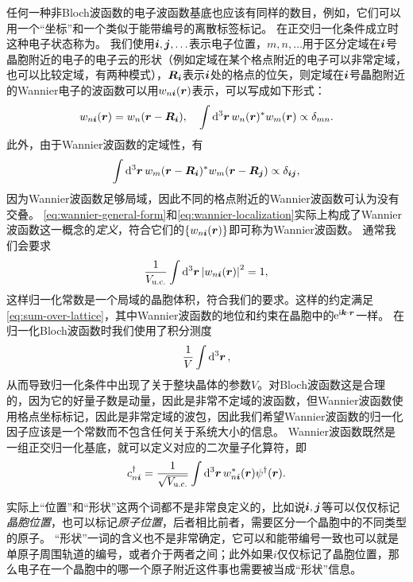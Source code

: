 任何一种非Bloch波函数的电子波函数基底也应该有同样的数目，例如，它们可以用一个“坐标”和一个类似于能带编号的离散标签标记。
在正交归一化条件成立时这种电子状态称为。
我们使用$\vb*{i}, \vb*{j}, \ldots$表示电子位置，$m, n, \ldots$用于区分定域在$\vb*{i}$号晶胞附近的电子的电子云的形状（例如定域在某个格点附近的电子可以非常定域，也可以比较定域，有两种模式），$\vb*{R}_{\vb*{i}}$表示$\vb*{i}$处的格点的位矢，则定域在$\vb*{i}$号晶胞附近的Wannier电子的波函数可以用$w_{n\vb*{i}}(\vb*{r})$表示，可以写成如下形式：
\begin{equation}
    w_{n \vb*{i}}(\vb*{r}) = w_{n}(\vb*{r} - \vb*{R}_{\vb*{i}}), \quad \int \dd[3]{\vb*{r}} w_n(\vb*{r})^* w_m(\vb*{r}) \propto \delta_{mn}.
    \label{eq:wannier-general-form}
\end{equation}
此外，由于Wannier波函数的定域性，有
\begin{equation}
    \int \dd[3]{\vb*{r}} w_m(\vb*{r} - \vb*{R}_{\vb*{i}})^* w_m(\vb*{r} - \vb*{R}_{\vb*{j}}) \propto \delta_{\vb*{i} \vb*{j}},
    \label{eq:wannier-localization}
\end{equation}
因为Wannier波函数足够局域，因此不同的格点附近的Wannier波函数可认为没有交叠。
\eqref{eq:wannier-general-form}和\eqref{eq:wannier-localization}实际上构成了Wannier波函数这一概念的\emph{定义}，符合它们的$\{w_{n \vb*{i}}(\vb*{r})\}$即可称为Wannier波函数。
通常我们会要求
\begin{equation}
    \frac{1}{V_\text{u.c.}} \int \dd[3]{\vb*{r}} \abs{w_{n \vb*{i}}(\vb*{r})}^2 = 1,
    \label{eq:wannier-function-normalization-uc}
\end{equation}
这样归一化常数是一个局域的晶胞体积，符合我们的要求。这样的约定满足\eqref{eq:sum-over-lattice}，其中Wannier波函数的地位和约束在晶胞中的$\mathrm{e}^{\mathrm{i} \vb*{k} \cdot \vb*{r}}$一样。
在归一化Bloch波函数时我们使用了积分测度
\[
    \frac{1}{V} \int \dd[3]{\vb*{r}},
\]
从而导致归一化条件中出现了关于整块晶体的参数$V$。对Bloch波函数这是合理的，因为它的好量子数是动量，因此是非常不定域的波函数，但Wannier波函数使用格点坐标标记，因此是非常定域的波包，因此我们希望Wannier波函数的归一化因子应该是一个常数而不包含任何关于系统大小的信息。
Wannier波函数既然是一组正交归一化基底，就可以定义对应的二次量子化算符，即
\begin{equation}
    {c}^\dagger_{n \vb*{i}} = \frac{1}{\sqrt{V_\text{u.c.}}} \int \dd[3]{\vb*{r}} w_{n \vb*{i}}^*(\vb*{r}) {\psi}^\dagger(\vb*{r}).
    \label{eq:wannier-and-free}
\end{equation}

实际上“位置”和“形状”这两个词都不是非常良定义的，比如说$\vb*{i}, \vb*{j}$等可以仅仅标记\emph{晶胞位置}，也可以标记\emph{原子位置}，后者相比前者，需要区分一个晶胞中的不同类型的原子。
“形状”一词的含义也不是非常确定，它可以和能带编号一致也可以就是单原子周围轨道的编号，或者介于两者之间；此外如果$i$仅仅标记了晶胞位置，那么电子在一个晶胞中的哪一个原子附近这件事也需要被当成“形状”信息。

